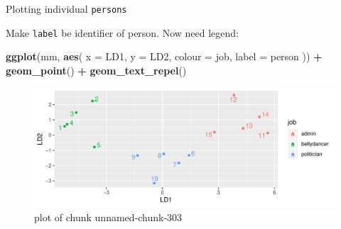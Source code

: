 \documentclass[ignorenonframetext,]{beamer}
\newenvironment{Shaded}{\begin{snugshade}}{\end{snugshade}}
\newcommand{\DataTypeTok}[1]{\textcolor[rgb]{0.13,0.29,0.53}{#1}}
\newcommand{\KeywordTok}[1]{\textcolor[rgb]{0.13,0.29,0.53}{\textbf{#1}}}
\newcommand{\NormalTok}[1]{#1}
\newcommand{\OperatorTok}[1]{\textcolor[rgb]{0.81,0.36,0.00}{\textbf{#1}}}
\newcommand{\StringTok}[1]{\textcolor[rgb]{0.31,0.60,0.02}{#1}}
\begin{document}
\begin{frame}[fragile]{Plotting individual \texttt{persons}}
\protect\hypertarget{plotting-individual-persons}{}

Make \texttt{label} be identifier of person. Now need legend:

\begin{Shaded}
\begin{Highlighting}[]
\KeywordTok{ggplot}\NormalTok{(mm, }\KeywordTok{aes}\NormalTok{(}
  \DataTypeTok{x =}\NormalTok{ LD1, }\DataTypeTok{y =}\NormalTok{ LD2,}
  \DataTypeTok{colour =}\NormalTok{ job, }\DataTypeTok{label =}\NormalTok{ person}
\NormalTok{)) }\OperatorTok{+}\StringTok{ }\KeywordTok{geom_point}\NormalTok{() }\OperatorTok{+}
\StringTok{  }\KeywordTok{geom_text_repel}\NormalTok{()}
\end{Highlighting}
\end{Shaded}

\begin{figure}
\centering
\includegraphics{figure/unnamed-chunk-303-1.pdf}
\caption{plot of chunk unnamed-chunk-303}
\end{figure}

\end{frame}
\end{document}
